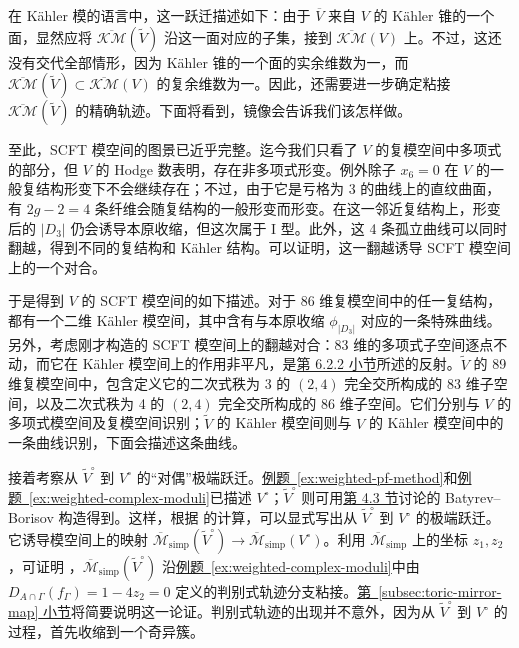 \begin{example}
在 Kähler 模的语言中，这一跃迁描述如下：由于 $\overline V$ 来自 $V$ 的 Kähler 锥的一个面，显然应将 $\overline{\mathcal{KM}}(\widetilde V)$ 沿这一面对应的子集，接到 $\overline{\mathcal{KM}}(V)$ 上。不过，这还没有交代全部情形，因为 Kähler 锥的一个面的实余维数为一，而 $\overline{\mathcal{KM}}(\widetilde V)\subset\overline{\mathcal{KM}}(V)$ 的复余维数为一。因此，还需要进一步确定粘接 $\overline{\mathcal{KM}}(\widetilde V)$ 的精确轨迹。下面将看到，镜像会告诉我们该怎样做。

至此，SCFT 模空间的图景已近乎完整。迄今我们只看了 $V$ 的复模空间中多项式的部分，但 $V$ 的 Hodge 数表明，存在非多项式形变。例外除子 $x_6=0$ 在 $V$ 的一般复结构形变下不会继续存在；不过，由于它是亏格为 3 的曲线上的直纹曲面，有 $2g-2=4$ 条纤维会随复结构的一般形变而形变。在这一邻近复结构上，形变后的 $|D_3|$ 仍会诱导本原收缩，但这次属于 I 型。此外，这 4 条孤立曲线可以同时翻越，得到不同的复结构和 Kähler 结构。可以证明，这一翻越诱导 SCFT 模空间上的一个对合。

于是得到 $V$ 的 SCFT 模空间的如下描述。对于 86 维复模空间中的任一复结构，都有一个二维 Kähler 模空间，其中含有与本原收缩 $\phi_{|D_3|}$ 对应的一条特殊曲线。另外，考虑刚才构造的 SCFT 模空间上的翻越对合：83 维的多项式子空间逐点不动，而它在 Kähler 模空间上的作用非平凡，是\hyperref[subsec:threefold-kahler-moduli]{第 6.2.2 小节}所述的反射。$\widetilde V$ 的 89 维复模空间中，包含定义它的二次式秩为 3 的 $(2,4)$ 完全交所构成的 83 维子空间，以及二次式秩为 4 的 $(2,4)$ 完全交所构成的 86 维子空间。它们分别与 $V$ 的多项式模空间及复模空间识别；$\widetilde V$ 的 Kähler 模空间则与 $V$ 的 Kähler 模空间中的一条曲线识别，下面会描述这条曲线。

接着考察从 $\widetilde V^\circ$ 到 $V^\circ$ 的“对偶”极端跃迁。\hyperref[ex:weighted-pf-method]{例题~\ref*{ex:weighted-pf-method}}和\hyperref[ex:weighted-complex-moduli]{例题~\ref*{ex:weighted-complex-moduli}}已描述 $V^\circ$；$\widetilde V^\circ$ 则可用\hyperref[sec:toric-complete-intersections]{第 4.3 节}讨论的 Batyrev--Borisov 构造得到。这样，根据  的计算，可以显式写出从 $\widetilde V^\circ$ 到 $V^\circ$ 的极端跃迁。它诱导模空间上的映射 $\overline{\mathcal M}_{\mathrm{simp}}(\widetilde V^\circ)\to\overline{\mathcal M}_{\mathrm{simp}}(V^\circ)$。利用 $\overline{\mathcal M}_{\mathrm{simp}}$ 上的坐标 $z_1,z_2$，可证明 ，$\overline{\mathcal M}_{\mathrm{simp}}(\widetilde V^\circ)$ 沿\hyperref[ex:weighted-complex-moduli]{例题~\ref*{ex:weighted-complex-moduli}}中由 $D_{A\cap\Gamma}(f_\Gamma)=1-4z_2=0$ 定义的判别式轨迹分支粘接。\hyperref[subsec:toric-mirror-map]{第~\ref*{subsec:toric-mirror-map} 小节}将简要说明这一论证。判别式轨迹的出现并不意外，因为从 $\widetilde V^\circ$ 到 $V^\circ$ 的过程，首先收缩到一个奇异簇。


\end{example}
